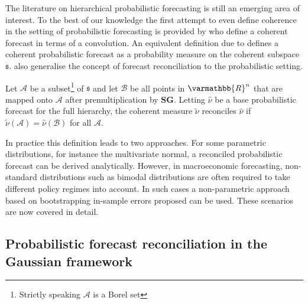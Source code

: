 \documentclass[graybox]{svmult}
\begin{document}
The literature on hierarchical probabilistic forecasting is still an emerging area of interest. %
To the best of our knowledge the first attempt to even define coherence in the setting of probabilistic forecasting is provided by \citet{Taieb2017} who define a coherent forecast in terms of a convolution. An equivalent definition due to \citet{GamEtAl2018} defines a coherent probabilistic forecast as a probability measure on the coherent subspace $\mathfrak{s}$. \citet{GamEtAl2018} also generalise the concept of forecast reconciliation to the probabilistic setting.

\begin{definition} Let $\mathcal{A}$ be a subset\footnote{Strictly speaking $\mathcal{A}$ is a Borel set} of $\mathfrak{s}$ and let $\mathcal{B}$ be all points in $\varmathbb{R}^n$ that are mapped onto $\mathcal{A}$ after premultiplication by $\bm{S}\bm{G}$. Letting $\hat{\nu}$ be a base probabilistic forecast for the full hierarchy, the coherent measure $\tilde{\nu}$ reconciles $\hat{\nu}$ if $\tilde{\nu}(\mathcal{A})=\hat{\nu}(\mathcal{B})$ for all $\mathcal{A}$.
\end{definition}

In practice this definition leads to two approaches. For some parametric distributions, for instance the multivariate normal, a reconciled probabilistic forecast can be derived analytically. However, in macroeconomic forecasting, non-standard distributions such as bimodal distributions are often required to take different policy regimes into account. In such cases a non-parametric approach based on bootstrapping in-sample errors proposed \citet{GamEtAl2018} can be used. These scenarios are now covered in detail.

\subsection{Probabilistic forecast reconciliation in the Gaussian framework}\label{sec:probrecgauss}

\end{document}
